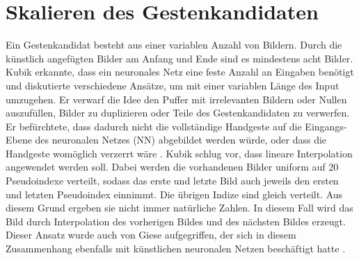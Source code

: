 \section{Skalieren des Gestenkandidaten}
\label{sec:scaling}
Ein Gestenkandidat besteht aus einer variablen Anzahl von Bildern. Durch die künstlich angefügten Bilder am Anfang und Ende sind es mindestens acht Bilder. Kubik erkannte, dass ein neuronales Netz eine feste Anzahl an
Eingaben benötigt und diskutierte verschiedene Ansätze, um mit einer variablen Länge des Input umzugehen. Er verwarf die Idee den Puffer mit irrelevanten Bildern oder Nullen auszufüllen, Bilder zu duplizieren
oder Teile des Gestenkandidaten zu verwerfen. Er befürchtete, dass dadurch nicht die vollständige Handgeste auf die Eingangs-Ebene des neuronalen Netzes (NN) abgebildet werden würde, oder dass die Handgeste
womöglich verzerrt wäre \cite{kubikThesis}.
\newline
\newline
Kubik schlug vor, dass lineare Interpolation angewendet werden soll. Dabei werden die vorhandenen Bilder uniform auf 20 Pseudoindexe verteilt, sodass das erste und letzte Bild auch
jeweils den ersten und letzten Pseudoindex einnimmt. Die übrigen Indize sind gleich verteilt. Aus diesem Grund ergeben sie nicht immer natürliche Zahlen. In diesem Fall wird das Bild durch Interpolation des
vorherigen Bildes und des nächsten Bildes erzeugt. Dieser Ansatz wurde auch von Giese aufgegriffen, der sich in diesem Zusammenhang
ebenfalls mit künstlichen neuronalen Netzen beschäftigt hatte \cite{gieseThesis}.